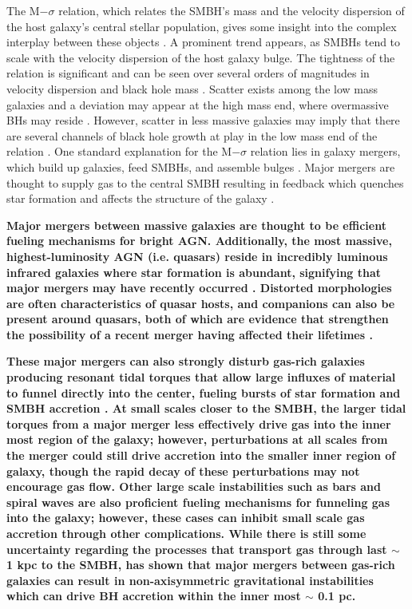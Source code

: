\documentclass[]{emulateapj}
\begin{document}
The M$-\sigma$ relation, which relates the SMBH's mass and the velocity dispersion of the host galaxy's central stellar population, gives some insight into the complex interplay between these objects \citep{Ferrarese2000,Gebhardt2000}. A prominent trend appears, as SMBHs tend to scale with the velocity dispersion of the host galaxy bulge. The tightness of the relation is significant and can be seen over several orders of magnitudes in velocity dispersion and black hole mass \citep[e.g.][]{Merritt2001,Tremaine2002,Graham2011,Mcconnell2013}. Scatter exists among the low mass galaxies and a deviation may appear at the high mass end, where overmassive BHs may reside \citep{VanDenBosch2007,Moster2010,Natarajan2011,Emsellem2011,Volonteri2016}. However, scatter in less massive galaxies may imply that there are several channels of black hole growth at play in the low mass end of the relation \citep{Micic2007,Volonteri2009,Reines2013,Graham2014}. One standard explanation for the M$-\sigma$ relation lies in galaxy mergers, which build up galaxies, feed SMBHs, and assemble bulges \citep[e.g.][]{DiMatteo2005,Shen2008}. Major mergers are thought to supply gas to the central SMBH resulting in feedback which quenches star formation and affects the structure of the galaxy \citep{Schawinski2010}. 

\textbf{Major mergers between massive galaxies are thought to be efficient fueling mechanisms for bright AGN. Additionally, the most massive, highest-luminosity AGN (i.e. quasars) reside in incredibly luminous infrared galaxies where star formation is abundant, signifying that major mergers may have recently occurred \citep{Treister2012}. Distorted morphologies are often characteristics of quasar hosts, and companions can also be present around quasars, both of which are evidence that strengthen the possibility of a recent merger having affected their lifetimes \citep{Ellison2010}.}

\textbf{These major mergers can also strongly disturb gas-rich galaxies producing resonant tidal torques that allow large influxes of material to funnel directly into the center, fueling bursts of star formation and SMBH accretion \citep[e.g.][]{Sanders1988,Sanders1996,Barnes1991,Mihos1996,Hopkins2006,Richards2006,Reddy2008,Hopkins2010}. At small scales closer to the SMBH, the larger tidal torques from a major merger less effectively drive gas into the inner most region of the galaxy; however, perturbations at all scales from the merger could still drive accretion into the smaller inner region of galaxy, though the rapid decay of these perturbations may not encourage gas flow. Other large scale instabilities such as bars and spiral waves are also proficient fueling mechanisms for funneling gas into the galaxy; however, these cases can inhibit small scale gas accretion through other complications. While there is still some uncertainty regarding the processes that transport gas through last $\sim$ 1 kpc to the SMBH, \cite{Hopkins2010} has shown that major mergers between gas-rich galaxies can result in non-axisymmetric gravitational instabilities which can drive BH accretion within the inner most $\sim$ 0.1 pc.}
\end{document}
